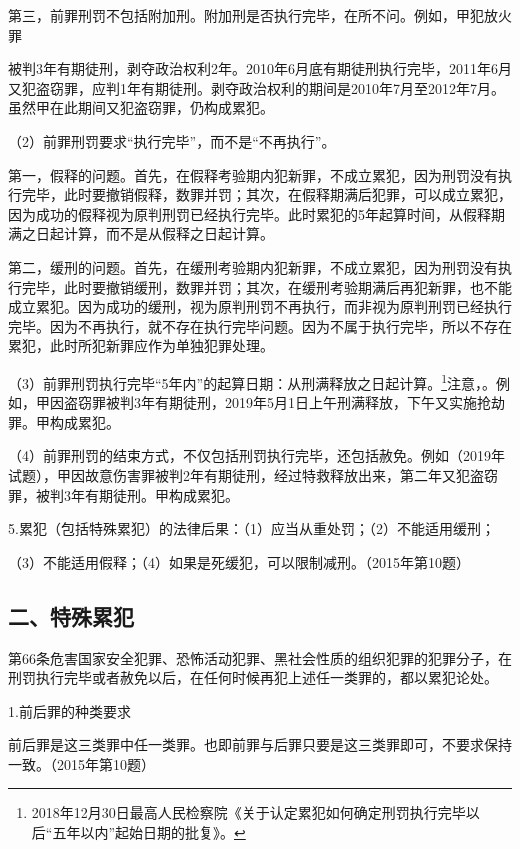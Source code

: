 第三，前罪刑罚不包括附加刑。附加刑是否执行完毕，在所不问。例如，甲犯放火罪

被判3年有期徒刑，剥夺政治权利2年。2010年6月底有期徒刑执行完毕，2011年6月又犯盗窃罪，应判1年有期徒刑。剥夺政治权利的期间是2010年7月至2012年7月。虽然甲在此期间又犯盗窃罪，仍构成累犯。

（2）前罪刑罚要求“执行完毕”，而不是“不再执行”。

第一，假释的问题。首先，在假释考验期内犯新罪，不成立累犯，因为刑罚没有执行完毕，此时要撤销假释，数罪并罚；其次，在假释期满后犯罪，可以成立累犯，因为成功的假释视为原判刑罚已经执行完毕。此时累犯的5年起算时间，从假释期满之日起计算，而不是从假释之日起计算。

第二，缓刑的问题。首先，在缓刑考验期内犯新罪，不成立累犯，因为刑罚没有执行完毕，此时要撤销缓刑，数罪并罚；其次，在缓刑考验期满后再犯新罪，也不能成立累犯。因为成功的缓刑，视为原判刑罚不再执行，而非视为原判刑罚已经执行完毕。因为不再执行，就不存在执行完毕问题。因为不属于执行完毕，所以不存在累犯，此时所犯新罪应作为单独犯罪处理。

（3）前罪刑罚执行完毕“5年内”的起算日期：从刑满释放之日起计算。\footnote{2018年12月30日最高人民检察院《关于认定累犯如何确定刑罚执行完毕以后“五年以内”起始日期的批复》。}注意，。例如，甲因盗窃罪被判3年有期徒刑，2019年5月1日上午刑满释放，下午又实施抢劫罪。甲构成累犯。

（4）前罪刑罚的结束方式，不仅包括刑罚执行完毕，还包括赦免。例如（2019年试题），甲因故意伤害罪被判2年有期徒刑，经过特救释放出来，第二年又犯盗窃罪，被判3年有期徒刑。甲构成累犯。

5.累犯（包括特殊累犯）的法律后果：（1）应当从重处罚；（2）不能适用缓刑；

（3）不能适用假释；（4）如果是死缓犯，可以限制减刑。（2015年第10题）

\subsection*{二、特殊累犯}

第66条危害国家安全犯罪、恐怖活动犯罪、黑社会性质的组织犯罪的犯罪分子，在刑罚执行完毕或者赦免以后，在任何时候再犯上述任一类罪的，都以累犯论处。

1.前后罪的种类要求

前后罪是这三类罪中任一类罪。也即前罪与后罪只要是这三类罪即可，不要求保持一致。（2015年第10题）


